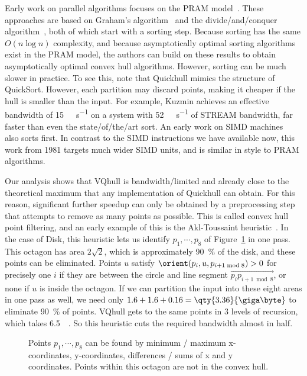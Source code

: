 Early work on parallel algorithms focuses on the PRAM model~\cite{goodrich1987finding,ghouse1991inplace}.
These approaches are based on Graham's algorithm~\cite{graham1972efficient} and the divide\-/and\-/conquer algorithm~\cite{preparata1977convex}, both of which start with a sorting step.
Because sorting has the same $O(n \log n)$ complexity, and because asymptotically optimal sorting algorithms exist in the PRAM model, the authors can build on these results to obtain asymptotically optimal convex hull algorithms.
However, sorting can be much slower in practice.
To see this, note that Quickhull mimics the structure of QuickSort.
However, each partition may discard points, making it cheaper if the hull is smaller than the input.
For example, Kuzmin achieves an effective bandwidth of \qty{15}{\giga\byte\per\second} on a system with \qty{52}{\giga\byte\per\second} of STREAM bandwidth, far faster than even the state\-/of\-/the\-/art sort.
An early work on SIMD machines~\cite{nath1981parallel} also sorts first.
In contrast to the SIMD instructions we have available now, this work from 1981 targets much wider SIMD units, and is similar in style to PRAM algorithms.

Our analysis shows that VQhull is bandwidth\-/limited and already close to the theoretical maximum that any implementation of Quickhull can obtain.
For this reason, significant further speedup can only be obtained by a preprocessing step that attempts to remove as many points as possible.
This is called convex hull point filtering, and an early example of this is the Akl-Toussaint heuristic~\cite{akl1978fast}.
In the case of Disk, this heuristic lets us identify $p_1, \cdots, p_8$ of Figure~\ref{fig:akl} in one pass.
This octagon has area $2\sqrt{2}$, which is approximately \qty{90}{\percent} of the disk, and these points can be eliminated.
Points $u$ satisfy $\orient(p_i, u, p_{i + 1 \bmod 8}) > 0$ for precisely one $i$ if they are between the circle and line segment $\overrightarrow{p_i p_{i + 1 \bmod 8}}$, or none if $u$ is inside the octagon.
If we can partition the input into these eight areas in one pass as well, we need only $1.6 + 1.6 + 0.16 = \qty{3.36}{\giga\byte}$ to eliminate \qty{90}{\percent} of points.
VQhull gets to the same points in 3 levels of recursion, which takes \qty{6.5}{\giga\byte}.
So this heuristic cuts the required bandwidth almost in half.

\begin{figure}[t]
  \centering
  \caption{Points $p_1, \cdots, p_8$ can be found by minimum / maximum x-coordinates, y-coordinates, differences / sums of x and y coordinates.
  Points within this octagon are not in the convex hull.}%
  \label{fig:akl}%
\end{figure}


